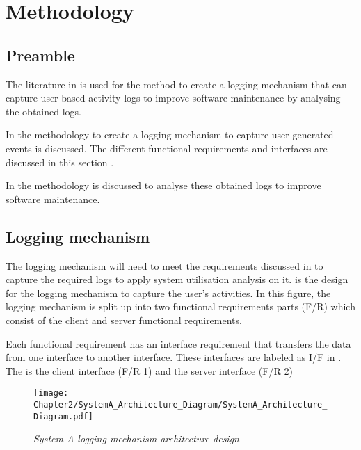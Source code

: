 \chapter{Methodology}
\label{chap:2}

\section{Preamble} The literature in  is used for the method to create a logging mechanism that can capture user-based activity logs to improve software maintenance by analysing the obtained logs.\par In  the methodology to create a logging mechanism to capture user-generated events is discussed. The different functional requirements and interfaces are discussed in this section \cite{Anish2015}.\par In  the methodology is discussed to analyse these obtained logs to improve software maintenance.

\section{Logging mechanism}\label{Ch2:LoggingMechanism} The logging mechanism will need to meet the requirements discussed in  to capture the required logs to apply system utilisation analysis on it.  is the design for the logging mechanism to capture the user's activities. In this figure, the logging mechanism is split up into two functional requirements parts (F/R) which consist of the client and server functional requirements.\par Each functional requirement has an interface requirement that transfers the data from one interface to another interface. These interfaces are labeled as I/F in . The  is the client interface (F/R 1) and the server interface (F/R 2)

\begin{figure}[!htb] %
	\centering %
	\texttt{[image: Chapter2/SystemA\_Architecture\_Diagram/SystemA\_Architecture\_Diagram.pdf]}
	\caption[System A logging mechanism architecture design]
	{\textit{System A logging mechanism architecture design}}\label{fig:CH2_SystemA_Arch_Design}
\end{figure}

